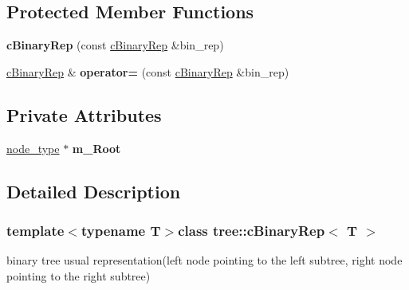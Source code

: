 \subsection*{Protected Member Functions}
\begin{DoxyCompactItemize}
\item 
\hypertarget{classtree_1_1cBinaryRep_a2b7e8d490a1e5f4b5c58fb58e29330ef}{{\bfseries c\-Binary\-Rep} (const \hyperlink{classtree_1_1cBinaryRep}{c\-Binary\-Rep} \&bin\-\_\-rep)}\label{classtree_1_1cBinaryRep_a2b7e8d490a1e5f4b5c58fb58e29330ef}

\item 
\hypertarget{classtree_1_1cBinaryRep_a4c6eb53e4805dcb0ac0032289bb7d0d8}{\hyperlink{classtree_1_1cBinaryRep}{c\-Binary\-Rep} \& {\bfseries operator=} (const \hyperlink{classtree_1_1cBinaryRep}{c\-Binary\-Rep} \&bin\-\_\-rep)}\label{classtree_1_1cBinaryRep_a4c6eb53e4805dcb0ac0032289bb7d0d8}

\end{DoxyCompactItemize}
\subsection*{Private Attributes}
\begin{DoxyCompactItemize}
\item 
\hypertarget{classtree_1_1cBinaryRep_acc04e77d74d4c7be7aceb048d512965a}{\hyperlink{structtree_1_1btree__node}{node\-\_\-type} $\ast$ {\bfseries m\-\_\-\-Root}}\label{classtree_1_1cBinaryRep_acc04e77d74d4c7be7aceb048d512965a}

\end{DoxyCompactItemize}


\subsection{Detailed Description}
\subsubsection*{template$<$typename T$>$class tree\-::c\-Binary\-Rep$<$ T $>$}

binary tree usual representation(left node pointing to the left subtree, right node pointing to the right subtree) 

